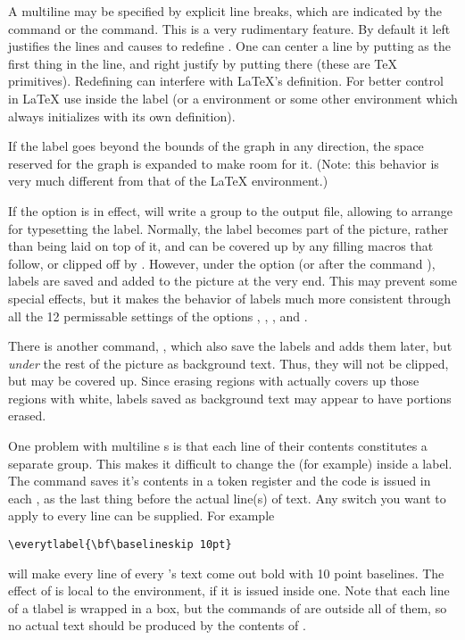 \documentclass[letterpaper]{article}
\begin{document}
A multiline  may be specified by explicit line breaks, which
are indicated by the \bbsl{} command or the  command. This is a
very rudimentary feature. By default it left justifies the lines and
causes  to redefine \bbsl. One can center a line by putting
 as the first thing in the line, and right justify by putting
 there (these are \TeX{} primitives). Redefining \bbsl{} can
interfere with \LaTeX{}'s definition. For better control in \LaTeX{} use
 inside the label (or a  environment or some
other environment which always initializes \bbsl{} with its own
definition).

If the label goes beyond the bounds of the graph in any direction, the
space reserved for the graph is expanded to make room for it. (Note:
this behavior is very much different from that of the \LaTeX{}
 environment.)

If the  option is in effect,  will write a
 group to the output file, allowing \MP{} to
arrange for typesetting the label. Normally, the label becomes part of
the picture, rather than being laid on top of it, and can be covered up
by any filling macros that follow, or clipped off by .
However, under the  option (or after the command
), labels are saved and added to the picture at the
very end. This may prevent some special effects, but it makes the
behavior of labels much more consistent through all the 12 permissable
settings of the options , , , and
.

There is another command, , which also save the labels
and adds them later, but \emph{under} the rest of the picture as
background text. Thus, they will not be clipped, but may be covered up.
Since erasing regions with  actually covers up those regions
with white, labels saved as background text may appear to have portions
erased.

\begin{cd}
%
\end{cd}

One problem with multiline s is that each line of their
contents constitutes a separate group. This makes it difficult to change
the  (for example) inside a label. The command
 saves it's contents in a token register and the code is
issued in each , as the last thing before the actual line(s)
of text. Any switch you want to apply to every line can be supplied. For
example
\begin{verbatim}
\everytlabel{\bf\baselineskip 10pt}
\end{verbatim}
will make every line of every 's text come out bold with 10
point baselines. The effect of  is local to the
 environment, if it is issued inside one. Note that each line
of a tlabel is wrapped in a box, but the commands of 
are outside all of them, so no actual text should be produced by the
contents of .
\end{document}
